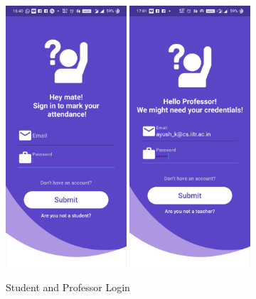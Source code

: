 \documentclass{article}
\begin{document}
\begin{figure}[H]
    \centering
    \includegraphics[width=0.40\textwidth]{StudentLogin.jpg}
    \includegraphics[width=0.40\textwidth]{ProfLogin.jpg}
    \caption{Student and Professor Login}
    \label{fig:StPrLogin}
\end{figure}
\end{document}
